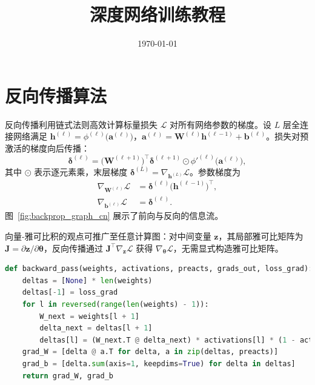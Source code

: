 ﻿\documentclass[UTF8,zihao=-4]{ctexart}
\title{深度网络训练教程}
\author{}
\date{\today}
\begin{document}
\maketitle

\section{反向传播算法}
反向传播利用链式法则高效计算标量损失 $\mathcal{L}$ 对所有网络参数的梯度。设 $L$ 层全连接网络满足 $\mathbf{h}^{(\ell)} = \phi^{(\ell)}\bigl(\mathbf{a}^{(\ell)}\bigr)$，$\mathbf{a}^{(\ell)} = \mathbf{W}^{(\ell)} \mathbf{h}^{(\ell-1)} + \mathbf{b}^{(\ell)}$。损失对预激活的梯度向后传播：
\begin{equation}
  \boldsymbol{\delta}^{(\ell)} = \bigl(\mathbf{W}^{(\ell+1)}\bigr)^{\top} \boldsymbol{\delta}^{(\ell+1)} \odot \phi'^{(\ell)}\bigl(\mathbf{a}^{(\ell)}\bigr),
\end{equation}
其中 $\odot$ 表示逐元素乘，末层梯度 $\boldsymbol{\delta}^{(L)} = \nabla_{\mathbf{h}^{(L)}} \mathcal{L}$。参数梯度为
\begin{align}
  \nabla_{\mathbf{W}^{(\ell)}} \mathcal{L} &= \boldsymbol{\delta}^{(\ell)} \bigl(\mathbf{h}^{(\ell-1)}\bigr)^{\top}, \\
  \nabla_{\mathbf{b}^{(\ell)}} \mathcal{L} &= \boldsymbol{\delta}^{(\ell)}.
\end{align}
图~\ref{fig:backprop_graph_cn} 展示了前向与反向的信息流。

向量-雅可比积的观点可推广至任意计算图：对中间变量 $\mathbf{z}$，其局部雅可比矩阵为 $\mathbf{J} = \partial \mathbf{z} / \partial \boldsymbol{\theta}$，反向传播通过 $\mathbf{J}^{\top} \nabla_{\mathbf{z}} \mathcal{L}$ 获得 $\nabla_{\boldsymbol{\theta}} \mathcal{L}$，无需显式构造雅可比矩阵。

\begin{lstlisting}[language=Python, caption={密集网络的小批量反向传播示例。}]
def backward_pass(weights, activations, preacts, grads_out, loss_grad):
    deltas = [None] * len(weights)
    deltas[-1] = loss_grad
    for l in reversed(range(len(weights) - 1)):
        W_next = weights[l + 1]
        delta_next = deltas[l + 1]
        deltas[l] = (W_next.T @ delta_next) * activations[l] * (1 - activations[l])
    grad_W = [delta @ a.T for delta, a in zip(deltas, preacts)]
    grad_b = [delta.sum(axis=1, keepdims=True) for delta in deltas]
    return grad_W, grad_b
\end{lstlisting}
\end{document}
